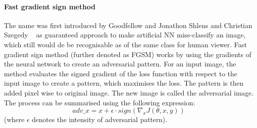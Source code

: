\paragraph{Fast gradient sign method}
The name was first introduced by Goodfellow and Jonathon Shlens and Christian Szegedy
~\cite{goodfellow2015explaining} as guaranteed approach to make artificial NN miss-classify an image,
which still would de be recognisable as of the same class for human viewer.
Fast gradient sign method (further denoted as FGSM) works by using the gradients of the neural network to create an adversarial pattern.
For an input image, the method evaluates the signed gradient of the loss function with respect to the input image to create a pattern,
which maximises the loss.
The pattern is then added pixel wise to original image.
The new image is called the adversarial image.
The process can be summarised using the following expression:
\begin{equation}
    adv\_x = x + \epsilon \cdot sign(\nabla_x J(\theta, x, y))
\end{equation}
(where $\epsilon$ denotes the intensity of adversarial pattern).
\\
